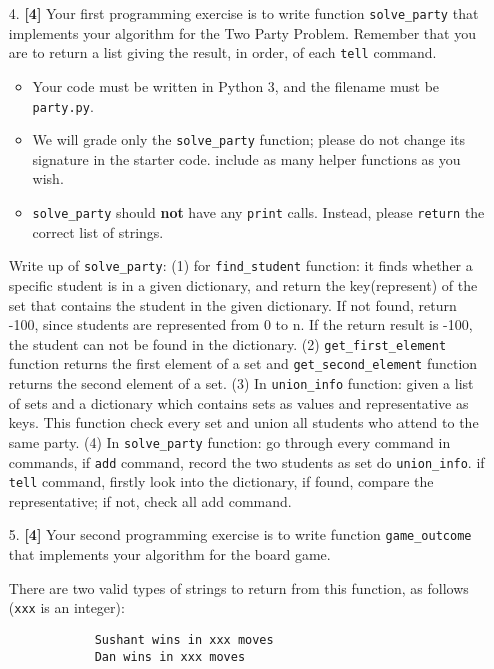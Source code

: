 \documentclass{assignment-263}
\begin{document}
\begin{enumerate}
	\item[4.] \textbf{[4]} Your first programming exercise is to write function
	\verb|solve_party| that implements your algorithm for the Two Party Problem. Remember that you are to return a list giving the result, in order, of each \verb|tell| command.
		\begin{itemize}
		\item Your code must be written in Python 3, and the filename must be \verb|party.py|.
\item We will grade only the \verb|solve_party| function; please do not change its signature in the starter code. include as many helper functions as you wish.
				\item \verb|solve_party| should {\bf not} have any
				\verb|print| calls. Instead, please \verb|return| the correct list of strings.
			\end{itemize}

Write up of \verb|solve_party|:\vskip5pt
(1) for \verb|find_student| function: it finds whether a specific student is in a given dictionary, and return the key(represent) of the set that contains the student in the given dictionary. If not found, return -100, since students are represented from 0 to n. If the return result is -100, the student can not be found in the dictionary.\vskip5pt
(2) \verb|get_first_element| function returns the first element of a set and \verb|get_second_element| function returns the second element of a set.\vskip5pt
(3) In \verb|union_info| function: given a list of sets and a dictionary which contains sets as values and representative as keys. This function check every set and union all students who attend to the same party.\vskip4pt
(4) In \verb|solve_party| function: go through every command in commands, if \verb|add| command, record the two students as set do \verb|union_info|. if \verb|tell| command, firstly look into the dictionary, if found, compare the representative; if not, check all add command. 

	
	\item[5.] \textbf{[4]} Your second programming exercise is to write function
	\verb|game_outcome| that implements your algorithm for the board
	game.

		There are two valid types of strings to return from this function,
		as follows (\verb|xxx| is an integer):
		\begin{small}
			\begin{verbatim}
			Sushant wins in xxx moves
			Dan wins in xxx moves
			\end{verbatim}
		\end{small}


\end{enumerate}
\end{document}
